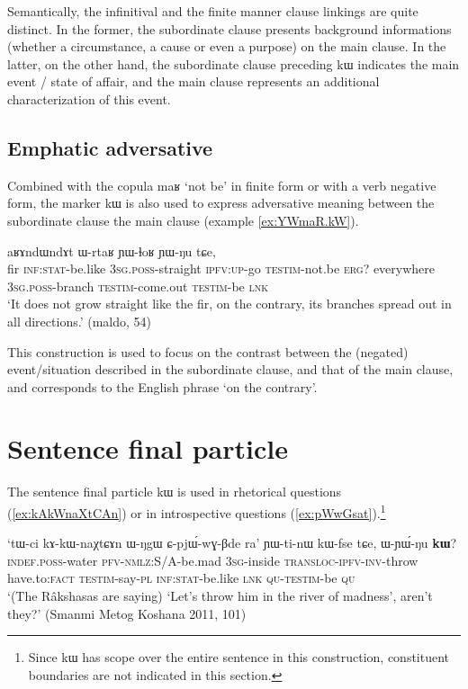\documentclass[oldfontcommands,oneside,a4paper,11pt]{article}
\newcommand{\ipa}[1]{{\phon #1}} %
\begin{document}
Semantically,  the infinitival and the finite manner clause linkings are quite distinct. In the former, the subordinate clause presents background informations (whether a circumstance, a cause or even a purpose) on the main clause. In the latter, on the other hand, the subordinate clause preceding \ipa{kɯ} indicates the main event / state of affair, and the main clause represents an additional characterization of this event.

 

 \subsection{Emphatic adversative} \label{sec:advers}
Combined with the copula \ipa{maʁ} `not be' in finite form or with a verb negative form, the marker \ipa{kɯ} is also used to express adversative meaning between the subordinate clause the main clause (example \ref{ex:YWmaR.kW}).
 
  \begin{exe} 
 \ex \label{ex:YWmaR.kW}
\gll [\ipa{tɯrgi} 	\ipa{kɯ-fse} 	\ipa{ɯ-stu} 	\ipa{tu-ɕe} 	\ipa{ɲɯ-maʁ}] 	\ipa{kɯ,} \ipa{aʁɤndɯndɤt} 	\ipa{ɯ-rtaʁ} 	\ipa{ɲɯ-ɬoʁ} 	\ipa{ɲɯ-ŋu} 	\ipa{tɕe,} 
\\
fir \textsc{inf:stat}-be.like \textsc{3sg.poss}-straight \textsc{ipfv:up}-go \textsc{testim}-not.be \textsc{erg}? everywhere \textsc{3sg.poss}-branch \textsc{testim}-come.out \textsc{testim}-be \textsc{lnk} \\ 
\glt `It does not grow straight like the fir, on the contrary, its branches spread out in all directions.'  
(maldo, 54)
 \end{exe}  
 
 This construction is used to focus on the contrast between the (negated) event/situation described in the subordinate clause, and that of the main clause, and corresponds to the English phrase `on the contrary'.
 
 \section{Sentence final particle} \label{sec:compl}
 
 
The sentence final particle \ipa{kɯ} is used in rhetorical questions (\ref{ex:kAkWnaXtCAn}) or in introspective questions (\ref{ex:pWwGsat}).\footnote{Since  \ipa{kɯ} has scope over the entire sentence in this construction,   constituent boundaries are not indicated in this section.  }

 \begin{exe} 
 \ex \label{ex:kAkWnaXtCAn}
\gll 
`\ipa{tɯ-ci} 	\ipa{kɤ-kɯ-naχtɕɤn} 	\ipa{ɯ-ŋgɯ} 	\ipa{ɕ-pjɯ́-wɣ-βde} 	\ipa{ra}' 	\ipa{ɲɯ-ti-nɯ} 	\ipa{kɯ-fse} 	\ipa{tɕe,} 	\ipa{ɯ-ɲɯ́-ŋu} 	\ipa{\textbf{kɯ}?} \\
\textsc{indef.poss}-water \textsc{pfv-nmlz}:S/A-be.mad \textsc{3sg}-inside \textsc{transloc-ipfv-inv}-throw have.to:\textsc{fact} \textsc{testim}-say-\textsc{pl} \textsc{inf:stat}-be.like \textsc{lnk} \textsc{qu-testim}-be \textsc{qu} \\
\glt `(The Râkshasas are saying)  `Let's throw him in the river of madness', aren't they?' (Smanmi Metog Koshana 2011, 101)
\end{exe} 
 
\end{document}
